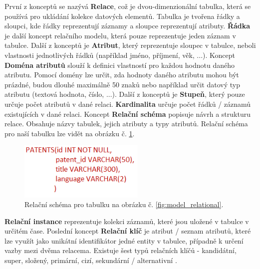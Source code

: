 \indent První z konceptů se nazývá \textbf{Relace}, což je dvou-dimenzionální tabulka, která se používá pro ukládání kolekce datových elementů. Tabulka je tvořena řádky a sloupci, kde řádky reprezentují záznamy a sloupce reprezentují atributy.
\newline
\indent \textbf{Řádka} je další koncept relačního modelu, která pouze reprezentuje jeden záznam v tabulce.
\newline
\indent Další z konceptů je \textbf{Atribut}, který reprezentuje sloupec v tabulce, neboli vlastnosti jednotlivých řádků (například jméno, příjmení, věk, ...).
\newline
\indent Koncept \textbf{Doména atributů} slouží k definici vlastností pro každou hodnotu daného atributu. Pomocí domény lze určit, zda hodnoty daného atributu mohou být prázdné, budou dlouhé maximálně 50 znaků nebo například určit datový typ atributu (textová hodnota, číslo, ...).
\newline
\indent Další z konceptů je \textbf{Stupeň}, který pouze určuje počet atributů v dané relaci.
\newline
\indent \textbf{Kardinalita} určuje počet řádků / záznamů existujících v dané relaci.
\newline
\indent Koncept \textbf{Relační schéma} popisuje návrh a strukturu relace. Obsahuje názvy tabulek, jejich atributy a typy atributů. Relační schéma pro naší tabulku lze vidět na obrázku č. \ref{fig:schema_relation}.
\begin{figure}[H]
\centering
\includegraphics[width=6cm]{img/databaze/schema_relation}
\caption{Relační schéma pro tabulku na obrázku č. \ref{fig:model_relational}.}
\label{fig:schema_relation}
\end{figure}

\indent \textbf{Relační instance} reprezentuje kolekci záznamů, které jsou uložené v tabulce v určitém čase.
\newline
\indent Poslední koncept \textbf{Relační klíč} je atribut / seznam atributů, které lze využít jako unikátní identifikátor jedné entity v tabulce, případně k určení vazby mezi dvěma relacema. Existuje šest typů relačních klíčů - kandidátní, super, složený, primární, cizí, sekundární / alternativní \cite{data_model_relation}.

